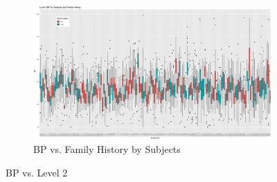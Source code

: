 \documentclass[12pt,twoside,leqno,fleqn,letterpaper]{article}
\theoremstyle{definition}
\theoremstyle{definition}
\newcommand{\detailtexcount}[1]{ %
\immediate\write18{texcount -merge -sum #1.tex > #1.wcdetail }%
%
}
\begin{document}
\begin{appendices}
    \begin{figure}[h] \ContinuedFloat
        \centering
        \begin{subfigure}[b]{\textwidth}
            \centering
            \includegraphics[width=\textwidth]{pics/bp by id and fh.png}
            \caption{BP vs. Family History by Subjects}
            \label{fig: bp v id and fh}
        \end{subfigure}
        \caption{BP vs. Level 2}
        \label{fig: bp v id and level2_3}
    \end{figure}

\end{appendices}

\singlespacing
% 
% 
\printbibliography
\end{document}
